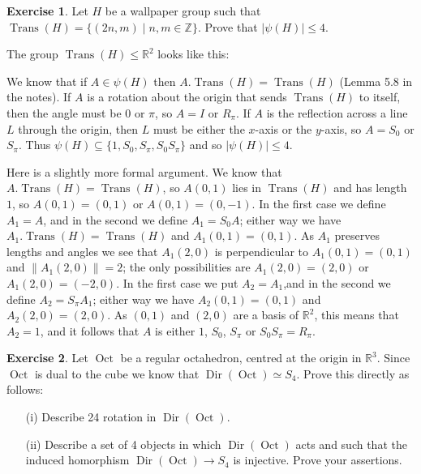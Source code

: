 \documentclass{amsart}
\DeclareMathOperator{\Dir}{Dir}
\DeclareMathOperator{\Trans}{Trans}
\DeclareMathOperator{\Oct}{Oct}
\newcommand{\xra}{\xrightarrow}
\renewcommand{\:}{\colon}
\newcommand{\sse}{\subseteq}
\newcommand{\st}{\;|\;}
\newcommand{\Z}{\mathbb{Z}}
\newcommand{\R}{\mathbb{R}}
\theoremstyle{definition}
\newtheorem{exercise}{Exercise}
\newenvironment{solution}{{\noindent\bf Solution:}}{}
\begin{document}
\begin{exercise}
 Let $H$ be a wallpaper group such that
 $\Trans(H)=\{(2n,m)\st n,m\in\Z\}$.  Prove that $|\psi(H)|\leq 4$.
\end{exercise}
\begin{solution}
 The group $\Trans(H)\leq\R^2$ looks like this:
 \begin{center}
 \end{center}
 We know that if $A\in\psi(H)$ then $A.\Trans(H)=\Trans(H)$ (Lemma 5.8
 in the notes).  If $A$ is a rotation about the origin that sends
 $\Trans(H)$ to itself, then the angle must be $0$ or $\pi$, so $A=I$
 or $R_{\pi}$.  If $A$ is the reflection across a line $L$ through the
 origin, then $L$ must be either the $x$-axis or the $y$-axis, so
 $A=S_0$ or $S_{\pi}$.  Thus $\psi(H)\sse\{1,S_0,S_\pi,S_0S_\pi\}$ and
 so $|\psi(H)|\leq 4$.
 
 Here is a slightly more formal argument.  We know that
 $A.\Trans(H)=\Trans(H)$, so $A(0,1)$ lies in $\Trans(H)$ and has
 length $1$, so $A(0,1)=(0,1)$ or $A(0,1)=(0,-1)$.  In the first case
 we define $A_1=A$, and in the second we define $A_1=S_0A$; either way
 we have $A_1.\Trans(H)=\Trans(H)$ and $A_1(0,1)=(0,1)$.  As $A_1$
 preserves lengths and angles we see that $A_1(2,0)$ is perpendicular
 to $A_1(0,1)=(0,1)$ and $\|A_1(2,0)\|=2$; the only possibilities are
 $A_1(2,0)=(2,0)$ or $A_1(2,0)=(-2,0)$.  In the first case we put
 $A_2=A_1$,and in the second we define $A_2=S_\pi A_1$; either way we
 have $A_2(0,1)=(0,1)$ and $A_2(2,0)=(2,0)$.  As $(0,1)$ and $(2,0)$
 are a basis of $\R^2$, this means that $A_2=1$, and it follows that
 $A$ is either $1$, $S_0$, $S_\pi$ or $S_0S_\pi=R_{\pi}$.
\end{solution}

\begin{exercise}
 Let $\Oct$ be a regular octahedron, centred at the origin in $\R^3$.
 Since $\Oct$ is dual to the cube we know that $\Dir(\Oct)\simeq S_4$.
 Prove this directly as follows:
 \begin{itemize}
  \item[(i)] Describe 24 rotation in $\Dir(\Oct)$.
  \item[(ii)] Describe a set of 4 objects in which $\Dir(\Oct)$ acts
   and such that the induced homorphism $\Dir(\Oct)\xra{}S_4$ is
   injective.  Prove your assertions.
 \end{itemize}
\end{exercise}
\begin{solution}

\end{solution}
\end{document}
